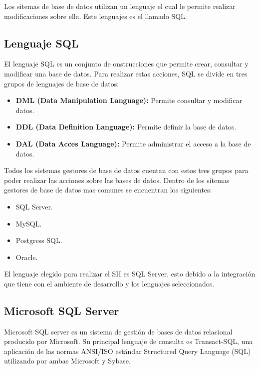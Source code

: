 	Los sitemas de base de datos utilizan un lenguaje el cual le permite realizar modificaciones sobre ella. Este lenguajes es el llamado SQL.

	\subsection{Lenguaje SQL}

	El lenguaje SQL es un conjunto de onstrucciones que permite crear, consultar y modificar una base de datos. Para realizar estas acciones, SQL se divide en tres grupos de lenguajes de base de datos:
	\begin{itemize}
		\item \textbf{DML (Data Manipulation Language):} Permite consultar y modificar datos.
		\item \textbf{DDL (Data Definition Language):} Permite definir la base de datos.
		\item \textbf{DAL (Data Acces Language):} Permite administrar el acceso a la base de datos.
	\end{itemize}

	Todos los sistemas gestores de base de datos cuentan con estos tres grupos para poder realizar las acciones sobre las bases de datos. Dentro de los sitemas gestores de base de datos mas comunes se encuentran los siguientes:

	\begin{itemize}
		\item SQL Server.
		\item MySQL.
		\item Postgress SQL.
		\item Oracle.
	\end{itemize}

	El lenguaje elegido para realizar el SII es SQL Server, esto debido a la integraci\'on que tiene con el ambiente de desarrollo y los lenguajes seleccionados.

	\subsection{Microsoft SQL Server}

	Microsoft SQL server es un sistema de gesti\'on de bases de datos relacional producido por Microsoft. Su principal lenguaje de consulta es Transact-SQL, una aplicaci\'on de las normas ANSI/ISO estándar Structured Query Language (SQL) utilizando por ambas Microsoft y Sybase.
	
